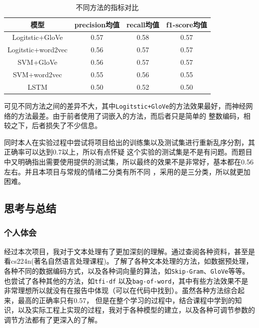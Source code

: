 \documentclass[UTF8]{ctexart}
\begin{document}
\vspace*{2em}
\begin{table}[htb]
    \centering
    \begin{tabular}{cccc}
    \toprule  %
    模型& precision均值& recall均值& f1-score均值\\
    \midrule
    Logitstic+GloVe& 0.57& 0.58 & 0.57\\
    Logitstic+word2vec& 0.56& 0.57 & 0.57\\
    SVM+GloVe& 0.56& 0.57 & 0.57\\
    SVM+word2vec& 0.55 & 0.56 & 0.55\\
    LSTM& 0.50 & 0.52 & 0.50\\
    \bottomrule
    
    \end{tabular}
    \caption{不同方法的指标对比}

\end{table}

可见不同方法之间的差异不大，其中\lstinline{Logitstic+GloVe}的方法效果最好，而神经网络的方法最差。由于前者使用了词嵌入的方法，而后者只是简单的
整数编码，相较之下，后者损失了不少信息。

同时本人在实验过程中尝试将项目给出的训练集以及测试集进行重新乱序分割，其正确率可以达到0.7以上，所以有点怀疑
这个实验的测试集是不是有问题。而题目中又明确指出需要使用提供的测试集，所以最终的效果不是非常好，基本都在0.56左右。并且本项目与常规的情绪二分类有所不同
，采用的是三分类，所以就更加困难。
\newpage

\subsection{思考与总结}

\subsubsection{个人体会}
经过本次项目，我对于文本处理有了更加深刻的理解。通过查阅各种资料，甚至是看cs224n(著名自然语言处理课程)。了解了各种文本处理的方法，如数据预处理，
各种不同的数据编码方式，以及各种词向量的算法，如\lstinline{Skip-Gram}、\lstinline{GloVe}等等。也尝试了各种其他的方法，如\lstinline{tfi-df}
以及\lstinline{bag-of-word}，其中有些方法效果不是非常理想所以就没有在报告中体现（可以在代码中找到）。虽然各种方法综合起来，最高的正确率只有0.57，
但是在整个学习的过程中，结合课程中学到的知识，以及实际工程上实现的过程，我对于各种模型的建立，以及各种可调节参数的调节方法都有了更深入的了解。
\end{document}
